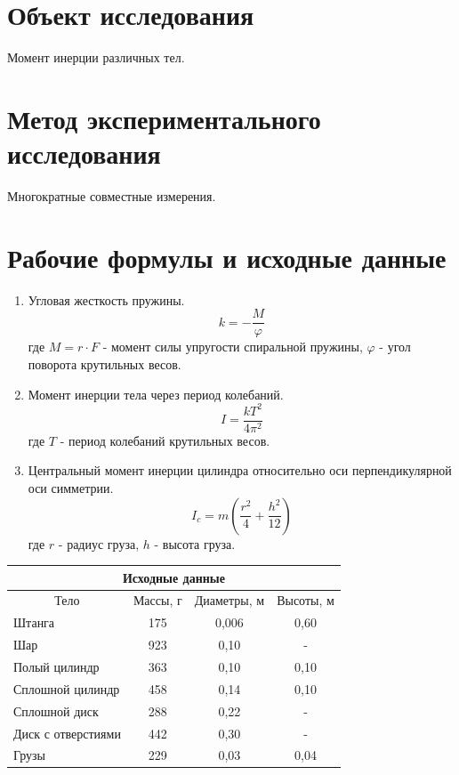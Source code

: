 \documentclass[a4paper,14pt]{article}
\begin{document}
\section{Объект исследования}

	Момент инерции различных тел.

\section{Метод экспериментального исследования}
	
	Многократные совместные измерения.
	
\section{Рабочие формулы и исходные данные}

\begin{enumerate}
	\item Угловая жесткость пружины.
	\begin{equation}
		k = -\frac{M}{\varphi}
	\end{equation}
	где \(M = r\cdot F\) -  момент силы упругости спиральной пружины, \(\varphi\) - угол поворота крутильных весов.
	
	\item Момент инерции тела через период колебаний.
	\begin{equation}
		I = \frac{kT^2}{4\pi^2}
	\end{equation}
	где \(T\) - период колебаний крутильных весов.
	
	\item Центральный момент инерции цилиндра относительно оси перпендикулярной оси симметрии.
	\begin{equation}
		I_{c} = m\left(\frac{r^2}{4} + \frac{h^2}{12}\right)
	\end{equation}
	где \(r\) - радиус груза, \(h\) - высота груза.

\end{enumerate}

\begin{center}
	\begin{tabular}{|l|c|c|c|}
		\multicolumn{4}{c}{Исходные данные} \bigstrut[b]\\
		\hline
		\multicolumn{1}{|c|}{Тело} & Массы, г & Диаметры, м & Высоты, м \bigstrut\\
		\hline
		Штанга & 175   & 0,006 & 0,60 \bigstrut\\
		\hline
		Шар   & 923   & 0,10 & - \bigstrut\\
		\hline
		\multicolumn{1}{|p{6.335em}|}{Полый цилиндр} & 363   & 0,10 & 0,10 \bigstrut\\
		\hline
		\multicolumn{1}{|p{6.335em}|}{Сплошной цилиндр} & 458   & 0,14 & 0,10 \bigstrut\\
		\hline
		Сплошной диск  & 288   & 0,22 & - \bigstrut\\
		\hline
		Диск с отверстиями  & 442   & 0,30 & - \bigstrut\\
		\hline
		Грузы & 229   & 0,03 & 0,04 \bigstrut\\
		\hline
	\end{tabular}
\end{center}
\end{document}
